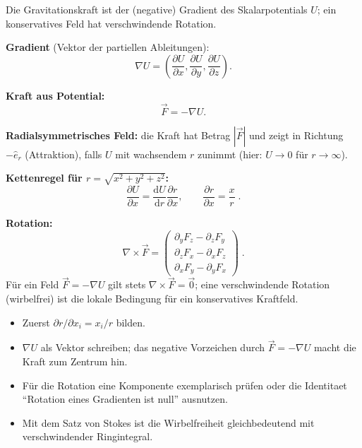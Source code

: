 

Die Gravitationskraft ist der (negative) Gradient des Skalarpotentials
$U$; ein konservatives Feld hat verschwindende Rotation.

\begin{werkzeugkasten}[Werkzeuge]
\textbf{Gradient} (Vektor der partiellen Ableitungen):
\begin{equation}
  \nabla U=\left(\frac{\partial U}{\partial x},
  \frac{\partial U}{\partial y},\frac{\partial U}{\partial z}\right).
\end{equation}

\textbf{Kraft aus Potential:}
\begin{equation}
  \vec F=-\nabla U.
\end{equation}

\textbf{Radialsymmetrisches Feld:} die Kraft hat Betrag $|\vec F|$ und
zeigt in Richtung $-\hat e_r$ (Attraktion), falls $U$ mit wachsendem $r$
zunimmt (hier: $U\to 0$ für $r\to\infty$).

\textbf{Kettenregel für $r=\sqrt{x^2+y^2+z^2}$:}
\begin{equation}
  \frac{\partial U}{\partial x}=\frac{\mathrm dU}{\mathrm dr}
  \frac{\partial r}{\partial x},\qquad
  \frac{\partial r}{\partial x}=\frac{x}{r}\;.
\end{equation}

\textbf{Rotation:}
\begin{equation}
  \nabla\times\vec F=
  \begin{pmatrix}\partial_yF_z-\partial_zF_y\\
  \partial_zF_x-\partial_xF_z\\
  \partial_xF_y-\partial_yF_x\end{pmatrix}\;.
\end{equation}
Für ein Feld $\vec F=-\nabla U$ gilt stets $\nabla\times\vec F=\vec 0$;
eine verschwindende Rotation (wirbelfrei) ist die lokale Bedingung für
ein konservatives Kraftfeld.
\end{werkzeugkasten}

\begin{werkzeugkasten}[Vorgehen]
\begin{itemize}
  \item Zuerst $\partial r/\partial x_i=x_i/r$ bilden.
  \item $\nabla U$ als Vektor schreiben; das negative Vorzeichen durch
        $\vec F=-\nabla U$ macht die Kraft zum Zentrum hin.
  \item Für die Rotation eine Komponente exemplarisch prüfen oder die
        Identitaet ``Rotation eines Gradienten ist null'' ausnutzen.
  \item Mit dem Satz von Stokes ist die Wirbelfreiheit gleichbedeutend
        mit verschwindender Ringintegral.
\end{itemize}
\end{werkzeugkasten}

